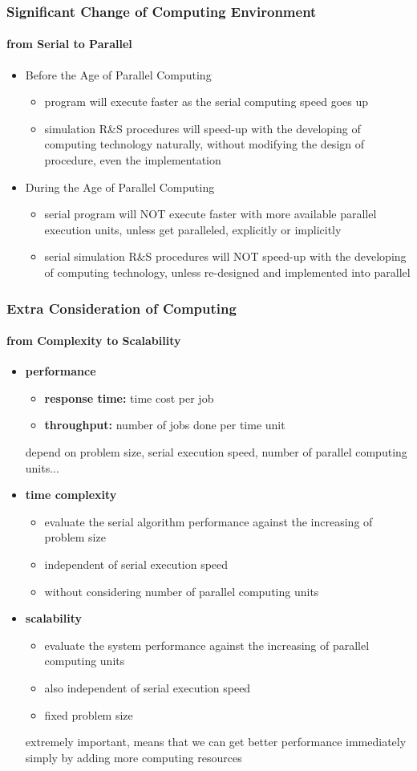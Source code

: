 \documentclass{beamer}
\begin{document}
\begin{frame}
\frametitle {Significant Change of Computing Environment}
\framesubtitle{from Serial to Parallel}
\begin{itemize}
\item Before the Age of Parallel Computing
\begin{itemize}
\item program will execute faster as the serial computing speed goes up
\item simulation R\&S procedures will speed-up with the developing of computing technology naturally, without modifying the design of procedure, even the implementation
\end{itemize}
\vspace{\baselineskip}
\item During the Age of Parallel Computing
\begin{itemize}
\item serial program will {\color{blue} NOT} execute faster with more available parallel execution units, unless get paralleled, explicitly or implicitly
\item serial simulation R\&S procedures will {\color{blue} NOT} speed-up with the developing of computing technology, unless re-designed and implemented into parallel
\end{itemize}
\end{itemize}
\end{frame}

\begin{frame}
\frametitle{Extra Consideration of Computing}
\framesubtitle{from Complexity to Scalability}
\begin{itemize}
\item {\bf performance}
\begin{itemize}
\item {\bf response time:} time cost per job
\item {\bf throughput:} number of jobs done per time unit
\end{itemize}
depend on problem size, serial execution speed, number of parallel computing units...
\item {\bf time complexity}
\begin{itemize}
\item evaluate the serial algorithm performance against the increasing of problem size
\item independent of serial execution speed
\item without considering number of parallel computing units
\end{itemize}
\item {\bf scalability}
\begin{itemize}
\item evaluate the system performance against the increasing of parallel computing units
\item also independent of serial execution speed
\item fixed problem size
\end{itemize}
extremely important, means that we can get better performance immediately simply by adding more computing resources
\end{itemize}
\end{frame}
\end{document}

